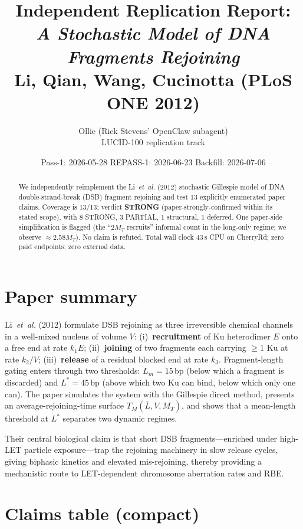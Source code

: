 \documentclass[11pt]{article}
\title{Independent Replication Report:\\
\emph{A Stochastic Model of DNA Fragments Rejoining}\\
Li, Qian, Wang, Cucinotta (PLoS ONE 2012)}
\author{Ollie (Rick Stevens' OpenClaw subagent) \\
LUCID-100 replication track}
\date{Pass-1: 2026-05-28 \quad REPASS-1: 2026-06-23 \quad Backfill: 2026-07-06}
\begin{document}
\maketitle

\begin{abstract}
We independently reimplement the Li~\emph{et~al.} (2012) stochastic Gillespie model of
DNA double-strand-break (DSB) fragment rejoining and test 13 explicitly enumerated
paper claims. Coverage is 13/13; verdict \textbf{STRONG} (paper-strongly-confirmed within
its stated scope), with 8 STRONG, 3 PARTIAL, 1 structural, 1 deferred. One paper-side
simplification is flagged (the ``$2M_T$ recruits'' informal count in the long-only regime;
we observe $\approx 2.58 M_T$). No claim is refuted. Total wall clock 43\,s CPU on
CherryRd; zero paid endpoints; zero external data.
\end{abstract}

\section{Paper summary}

Li~\emph{et~al.} (2012) formulate DSB rejoining as three irreversible chemical channels in a
well-mixed nucleus of volume $V$: (i)~\textbf{recruitment} of Ku heterodimer $E$ onto a
free end at rate $k_1 E$; (ii)~\textbf{joining} of two fragments each carrying
$\geq 1$ Ku at rate $k_2/V$; (iii)~\textbf{release} of a residual blocked end at rate
$k_3$. Fragment-length gating enters through two thresholds:
$L_m=15$\,bp (below which a fragment is discarded) and $L^\ast=45$\,bp (above which two
Ku can bind, below which only one can). The paper simulates the system with the Gillespie
direct method, presents an average-rejoining-time surface $T_M(\bar L, V, M_T)$, and shows
that a mean-length threshold at $L^\ast$ separates two dynamic regimes.

Their central biological claim is that short DSB fragments---enriched under high-LET
particle exposure---trap the rejoining machinery in slow release cycles, giving
biphasic kinetics and elevated mis-rejoining, thereby providing a mechanistic route to
LET-dependent chromosome aberration rates and RBE.

\section{Claims table (compact)}
\end{document}
